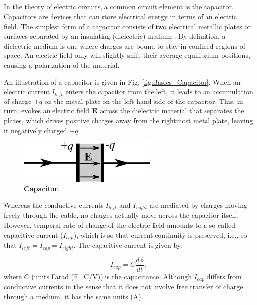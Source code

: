 \subsection{}
In the theory of electric circuits, a common circuit element is the capacitor. Capacitors are devices that can store electrical energy in terms of an electric field. The simplest form of a capacitor consists of two electrical metallic plates or surfaces separated by an insulating (dielectric) medium .  By definition, a dielectric medium is one where charges are bound to stay in confined regions of space. An electric field only will slightly shift their average equilibrium positions, causing a polarization of the material.

An illustration of a capacitor is given in Fig. \ref{fig:Basics_Capacitor}. When an electric current $I_{left}$ enters the capacitor from the left, it leads to an accumulation of charge $+q$ on the metal plate on the left hand side of the capacitor. This, in turn, evokes an electric field $\bf E$ across the dielectric material that separates the plates, which drives positive charges away from the rightmost metal plate, leaving it negatively charged $-q$. 

\begin{figure}[!ht]
\begin{center}
\includegraphics[width=0.6\textwidth]{Figures/Basics/Capacitor.png}
\end{center}
\caption{{\bf Capacitor}.  
}
\label{fig:Basics:Capacitor}
\end{figure}

Whereas the conductive currents $I_{left}$ and $I_{right}$ are mediated by charges moving freely through the cable, no charges actually move across the capacitor itself. However, temporal rate of change of the electric field amounts to a so-called capacitive current  ($I_{cap}$), which is so that current continuity is preserved, i.e., so that $I_{left} = I_{cap} = I_{right}$. The capacitive current is given by: 

\begin{equation}
I_{cap} = C\frac{d\phi}{dt}, 
\label{eq:Basics:Icap}
\end{equation}
where $C$ (units Farad (F=C/V)) is the capacitance. Although $I_{cap}$ differs from conductive currents in the sense that it does not involve free transfer of charge through a medium, it has the same units (A). 

